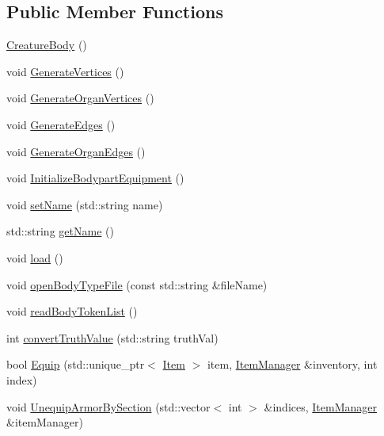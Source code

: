 \subsection*{Public Member Functions}
\begin{DoxyCompactItemize}
\item 
\mbox{\hyperlink{class_creature_body_ad40931736728dce1b6cf2c235c883695}{Creature\+Body}} ()
\item 
void \mbox{\hyperlink{class_creature_body_af7047fb13005abbb9a816c0dd64af873}{Generate\+Vertices}} ()
\item 
void \mbox{\hyperlink{class_creature_body_a9cf5cffe6209ed851bf32c2b164d9391}{Generate\+Organ\+Vertices}} ()
\item 
void \mbox{\hyperlink{class_creature_body_a8feda2cfc35e1b76730a31eb368ffed6}{Generate\+Edges}} ()
\item 
void \mbox{\hyperlink{class_creature_body_af1303a40606bf06aed980f14e7027d54}{Generate\+Organ\+Edges}} ()
\item 
void \mbox{\hyperlink{class_creature_body_af2b152c045862bb0fbc370b444bf98f0}{Initialize\+Bodypart\+Equipment}} ()
\item 
void \mbox{\hyperlink{class_creature_body_a5fa474a4a6f2c04d6ae55db42e6a9c75}{set\+Name}} (std\+::string name)
\item 
std\+::string \mbox{\hyperlink{class_creature_body_abfbe9ab6a145745934fc7fafefccdb67}{get\+Name}} ()
\item 
void \mbox{\hyperlink{class_creature_body_a947efb646a893964de6244b886bab038}{load}} ()
\item 
void \mbox{\hyperlink{class_creature_body_ac4140e081c8970ad4330c253c615ba33}{open\+Body\+Type\+File}} (const std\+::string \&file\+Name)
\item 
void \mbox{\hyperlink{class_creature_body_a52d765dd974e81a549fd0cb27b355cf2}{read\+Body\+Token\+List}} ()
\item 
int \mbox{\hyperlink{class_creature_body_a2e5f101eb4ce889f47810e8e65164d50}{convert\+Truth\+Value}} (std\+::string truth\+Val)
\item 
bool \mbox{\hyperlink{class_creature_body_a8a55f2c0785aaf956cdee04a538dfb97}{Equip}} (std\+::unique\+\_\+ptr$<$ \mbox{\hyperlink{class_item}{Item}} $>$ item, \mbox{\hyperlink{class_item_manager}{Item\+Manager}} \&inventory, int index)
\item 
void \mbox{\hyperlink{class_creature_body_aa923b5ba453a19b651af7290d568a4fc}{Unequip\+Armor\+By\+Section}} (std\+::vector$<$ int $>$ \&indices, \mbox{\hyperlink{class_item_manager}{Item\+Manager}} \&item\+Manager)

\end{DoxyCompactItemize}
